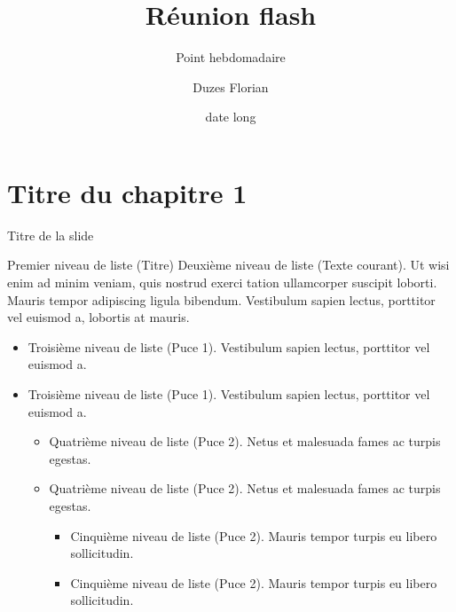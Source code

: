 \documentclass[A4,svgnames,9pt,aspectratio=169]{beamer}
\title[titrecourt]{Réunion flash}
\subtitle{Point hebdomadaire}
\date[\today]{date long}
\author[Duzes Florian]{Duzes Florian}
\begin{document}

\frame{\titlepage}


\renewcommand{\contentsname}{Sommaire}


\frame{\tocpage}

 
\section{Titre du chapitre 1}
\frame{\sectionpage}


\begin{frame}{Titre de la slide}
    \begin{block}{Premier niveau de liste (Titre)}
       Deuxième niveau de liste (Texte courant). Ut wisi enim ad minim veniam, quis nostrud exerci tation
       ullamcorper suscipit loborti. Mauris tempor adipiscing ligula bibendum. Vestibulum sapien lectus,
       porttitor vel euismod a, lobortis at mauris.
      \begin{itemize}
         \item Troisième niveau de liste (Puce 1). Vestibulum sapien lectus, porttitor vel euismod a.
         \item Troisième niveau de liste (Puce 1). Vestibulum sapien lectus, porttitor vel euismod a.
         \begin{itemize}
            \item Quatrième niveau de liste (Puce 2). Netus et malesuada fames ac turpis egestas.
            \item Quatrième niveau de liste (Puce 2). Netus et malesuada fames ac turpis egestas.
            \begin{itemize}
               \item Cinquième niveau de liste (Puce 2). Mauris tempor turpis eu libero sollicitudin.
               \item Cinquième niveau de liste (Puce 2). Mauris tempor turpis eu libero sollicitudin.
            \end{itemize}
          \end{itemize}
        \end{itemize}
   \end{block}
\end{frame}
\end{document}
